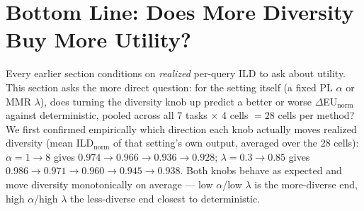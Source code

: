 \documentclass[10pt]{article}
\begin{document}
\FloatBarrier
\section{Bottom Line: Does More Diversity Buy More Utility?}
\label{sec:diversity-trend}

Every earlier section conditions on \emph{realized} per-query ILD to ask about
utility. This section asks the more direct question: for the setting itself (a
fixed PL $\alpha$ or MMR $\lambda$), does turning the diversity knob up predict a
better or worse $\Delta$EU$_{\text{norm}}$ against deterministic, pooled across all
7 tasks $\times$ 4 cells $= 28$ cells per method? We first confirmed empirically
which direction each knob actually moves realized diversity (mean
ILD$_{\text{norm}}$ of that setting's own output, averaged over the 28 cells):
$\alpha{=}1{\to}8$ gives $0.974 \to 0.966 \to 0.936 \to 0.928$; $\lambda{=}0.3{\to}0.85$
gives $0.986 \to 0.971 \to 0.960 \to 0.945 \to 0.938$. Both knobs behave as expected
and move diversity monotonically on average --- low $\alpha$/low $\lambda$ is the
more-diverse end, high $\alpha$/high $\lambda$ the less-diverse end closest to
deterministic.
\end{document}
